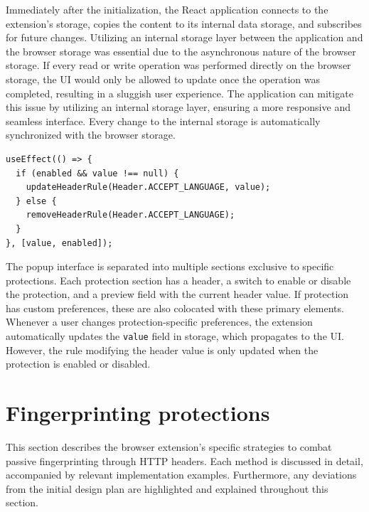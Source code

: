 \medbreak

Immediately after the initialization, the React application connects to the extension's storage, copies the content to its internal data storage, and subscribes for future changes. Utilizing an internal storage layer between the application and the browser storage was essential due to the asynchronous nature of the browser storage. If every read or write operation was performed directly on the browser storage, the UI would only be allowed to update once the operation was completed, resulting in a sluggish user experience. The application can mitigate this issue by utilizing an internal storage layer, ensuring a more responsive and seamless interface. Every change to the internal storage is automatically synchronized with the browser storage.

\bigbreak

\begin{lstlisting}[caption={A part of the code that updates the HTTP header-modifying rule when a protection is enabled or disabled.}]
useEffect(() => {
  if (enabled && value !== null) {
    updateHeaderRule(Header.ACCEPT_LANGUAGE, value);
  } else {
    removeHeaderRule(Header.ACCEPT_LANGUAGE);
  }
}, [value, enabled]);
\end{lstlisting}

\medbreak

The popup interface is separated into multiple sections exclusive to specific protections. Each protection section has a header, a switch to enable or disable the protection, and a preview field with the current header value. If protection has custom preferences, these are also colocated with these primary elements. Whenever a user changes protection-specific preferences, the extension automatically updates the \texttt{value} field in storage, which propagates to the UI. However, the rule modifying the header value is only updated when the protection is enabled or disabled.

\section{Fingerprinting protections}

This section describes the browser extension's specific strategies to combat passive fingerprinting through HTTP headers. Each method is discussed in detail, accompanied by relevant implementation examples. Furthermore, any deviations from the initial design plan are highlighted and explained throughout this section.

